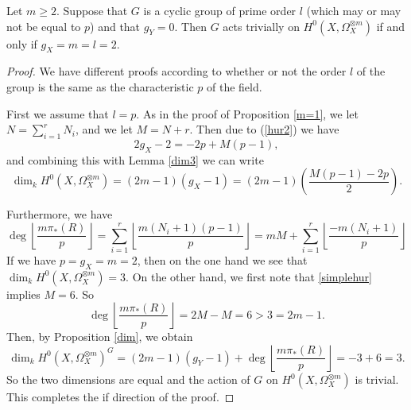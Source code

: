     \begin{prop}\label{triv}
    Let $m \geq 2$. 
    Suppose that $G$ is a cyclic group of prime order $l$ (which may or may not be equal to $p$) and that $g_Y=0$. 
    Then $G$ acts trivially on $H^0(X,\Omega_X^{\otimes m})$ if and only if $g_X=m=l=2$.
    \end{prop}
    \begin{proof}
    We have different proofs according to whether or not the order $l$ of the group is the same as the characteristic $p$ of the field.
    
    
    First we assume that $l=p$. 
    As in the proof of Proposition \ref{m=1}, we let $N=\sum_{i=1}^r N_i$, and we let $M=N+r$.
    Then due to (\ref{hur2}) we have
        \begin{equation}\label{simplehur}
        2g_X-2=-2p+M(p-1),
        \end{equation}
    and combining this with Lemma \ref{dim3} we can write
        \begin{equation}\label{altdim2}
        \dim_kH^0(X,\Omega_X^{\otimes m})=(2m-1)(g_X-1)=(2m-1)\left(\frac{M(p-1)-2p}{2}\right).
        \end{equation}
    
    Furthermore, we have
        \begin{equation}\label{altdim}
        \deg\left\lfloor \frac{m\pi_*(R)}{p} \right\rfloor = \sum_{i=1}^r\left\lfloor \frac{m(N_i+1)(p-1)}{p} \right\rfloor  = mM + \sum_{i=1}^r\left\lfloor \frac{-m(N_i+1)}{p} \right\rfloor
        \end{equation}
    If we have $p=g_X=m=2$, then on the one hand we see that $\dim_kH^0(X,\Omega_X^{\otimes m}) =3$. 
    On the other hand, we first note that \eqref{simplehur} implies $M=6$.
    So 
        \begin{equation*}
        \deg\left\lfloor \frac{m\pi_*(R)}{p}\right\rfloor = 2M -M =6 > 3 = 2m-1.
        \end{equation*}  
    Then, by Proposition \ref{dim}, we obtain 
        \begin{equation*}
        \dim_kH^0(X,\Omega_X^{\otimes m})^G = (2m-1)(g_Y-1)+\deg\left\lfloor \frac{m\pi_*(R)}{p} \right\rfloor = -3 + 6 = 3.
        \end{equation*}
    So the two dimensions are equal and the action of $G$ on $H^0(X,\Omega_X^{\otimes m})$ is trivial. 
    This completes the if direction of the proof.
    

\end{proof}
